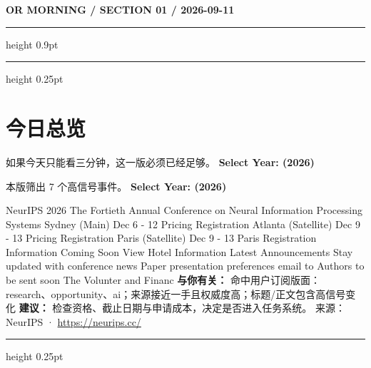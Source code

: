 \documentclass[10.5pt]{ctexart}
\begin{document}
{\small\bfseries OR MORNING / SECTION 01 / 2026-09-11}
\vspace{2mm}
\hrule height 0.9pt
\vspace{1.5mm}
\hrule height 0.25pt
\vspace{4mm}
\section*{今日总览}
{\color{ormuted} 如果今天只能看三分钟，这一版必须已经足够。}
\vspace{2mm}
{\fontsize{25}{29}\selectfont\bfseries Select Year: (2026)}\par
\vspace{2mm}
{\large 本版筛出 7 个高信号事件。}
\vspace{3mm}
{\Large\bfseries Select Year: (2026)}\par
NeurIPS 2026 The Fortieth Annual Conference on Neural Information Processing Systems Sydney (Main) Dec 6 - 12 Pricing Registration Atlanta (Satellite) Dec 9 - 13 Pricing Registration Paris (Satellite) Dec 9 - 13 Paris Registration Information Coming Soon View Hotel Information Latest Announcements Stay updated with conference news Paper presentation preferences email to Authors to be sent soon The Volunter and Financ
\textbf{与你有关：} 命中用户订阅版面：research、opportunity、ai；来源接近一手且权威度高；标题/正文包含高信号变化
\textbf{建议：} 检查资格、截止日期与申请成本，决定是否进入任务系统。
{\footnotesize\color{ormuted} 来源：NeurIPS · \url{https://neurips.cc/}}
\vspace{3mm}
\hrule height 0.25pt
\vspace{3mm}
\end{document}
